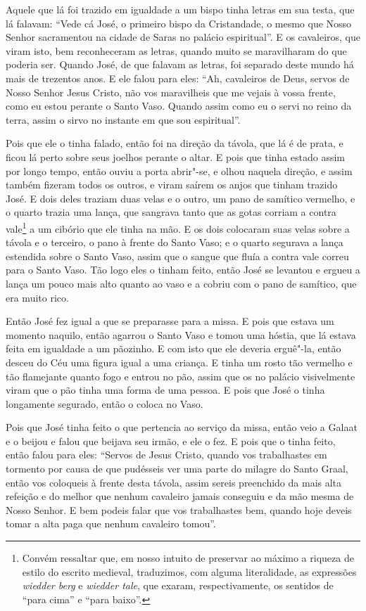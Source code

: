 Aquele que lá foi trazido em igualdade a um bispo tinha letras em sua testa, que
lá falavam: “Vede cá José, o primeiro bispo da Cristandade, o mesmo que Nosso
Senhor sacramentou na cidade de Saras no palácio espiritual”. E os cavaleiros,
que viram isto, bem reconheceram as letras, quando muito se maravilharam do que
poderia ser. Quando José, de que falavam as letras, foi separado deste mundo há
mais de trezentos anos. E ele falou para eles: “Ah, cavaleiros de Deus, servos
de Nosso Senhor Jesus Cristo, não vos maravilheis que me vejais à vossa frente,
como eu estou perante o Santo Vaso. Quando assim como eu o servi no reino da
terra, assim o sirvo no instante em que sou espiritual”. 

Pois que ele o tinha falado, então foi na direção da távola, que lá é de prata,
e ficou lá perto sobre seus joelhos perante o altar. E pois que tinha estado
assim por longo tempo, então ouviu a porta abrir"-se, e olhou naquela direção, e
assim também fizeram todos os outros, e viram saírem os anjos que tinham
trazido José. E dois deles traziam duas velas e o outro, um pano de samítico
vermelho, e o quarto trazia uma lança, que sangrava tanto que as gotas corriam
a contra vale\footnote{ Convém ressaltar que, em nosso intuito de preservar ao
máximo a riqueza de estilo do escrito medieval, traduzimos, com alguma
literalidade, as expressões \textit{wiedder berg}   e \textit{wiedder tale},  que exaram,
respectivamente, os sentidos de “para cima” e “para baixo”.} a um
cibório que ele tinha na mão. E os dois colocaram suas velas sobre a távola e o
terceiro, o pano à frente do Santo Vaso; e o quarto segurava a lança estendida
sobre o Santo Vaso, assim que o sangue que fluía a contra vale correu para o
Santo Vaso. Tão logo eles o tinham feito, então José se levantou e ergueu a
lança um pouco mais alto quanto ao vaso e a cobriu com o pano de samítico, que
era muito rico. 

Então José fez igual a que se preparasse para a missa. E pois que estava um
momento naquilo, então agarrou o Santo Vaso e tomou uma hóstia, que lá estava
feita em igualdade a um pãozinho. E com isto que ele deveria erguê"-la, então
desceu do Céu uma figura igual a uma criança. E tinha um rosto tão vermelho e
tão flamejante quanto fogo e entrou no pão, assim que os no palácio
visivelmente viram que o pão tinha uma forma de uma pessoa. E pois que José o
tinha longamente segurado, então o coloca no Vaso. 

Pois que José tinha feito o que pertencia ao serviço da missa, então veio a
Galaat e o beijou e falou que beijava seu irmão, e ele o fez. E pois que o
tinha feito, então falou para eles: “Servos de Jesus Cristo, quando vos
trabalhastes em tormento por causa de que pudésseis ver uma parte do milagre do
Santo Graal, então vos coloqueis à frente desta távola, assim sereis preenchido
da mais alta refeição e do melhor que nenhum cavaleiro jamais conseguiu e da
mão mesma de Nosso Senhor. E bem podeis falar que vos trabalhastes bem, quando
hoje deveis tomar a alta paga que nenhum cavaleiro tomou”.

